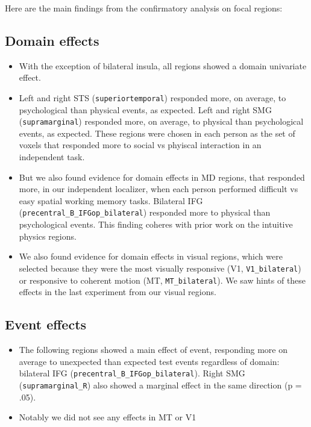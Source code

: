\documentclass[
]{article}
\providecommand{\tightlist}{%
  \setlength{\itemsep}{0pt}\setlength{\parskip}{0pt}}
\begin{document}
Here are the main findings from the confirmatory analysis on focal
regions:

\hypertarget{domain-effects}{%
\subsection{Domain effects}\label{domain-effects}}

\begin{itemize}
\tightlist
\item
  With the exception of bilateral insula, all regions showed a domain
  univariate effect.
\item
  Left and right STS (\texttt{superiortemporal}) responded more, on
  average, to psychological than physical events, as expected. Left and
  right SMG (\texttt{supramarginal}) responded more, on average, to
  physical than psychological events, as expected. These regions were
  chosen in each person as the set of voxels that responded more to
  social vs phyiscal interaction in an independent task.
\item
  But we also found evidence for domain effects in MD regions, that
  responded more, in our independent localizer, when each person
  performed difficult vs easy spatial working memory tasks. Bilateral
  IFG (\texttt{precentral\_B\_IFGop\_bilateral}) responded more to
  physical than psychological events. This finding coheres with prior
  work on the intuitive physics regions.
\item
  We also found evidence for domain effects in visual regions, which
  were selected because they were the most visually responsive (V1,
  \texttt{V1\_bilateral}) or responsive to coherent motion (MT,
  \texttt{MT\_bilateral}). We saw hints of these effects in the last
  experiment from our visual regions.
\end{itemize}

\hypertarget{event-effects}{%
\subsection{Event effects}\label{event-effects}}

\begin{itemize}
\tightlist
\item
  The following regions showed a main effect of event, responding more
  on average to unexpected than expected test events regardless of
  domain: bilateral IFG (\texttt{precentral\_B\_IFGop\_bilateral}).
  Right SMG (\texttt{supramarginal\_R}) also showed a marginal effect in
  the same direction (p = .05).
\item
  Notably we did not see any effects in MT or V1
\end{itemize}
\end{document}
